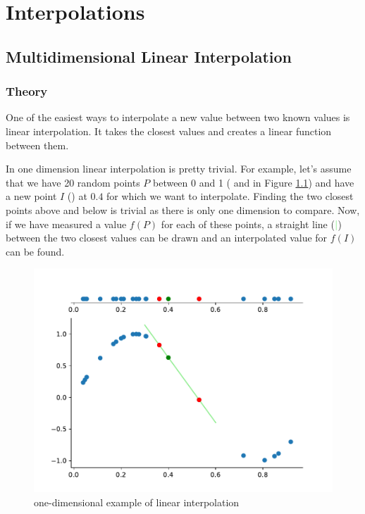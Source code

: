 \chapter{Interpolations}

\section{Multidimensional Linear Interpolation}

\subsection{Theory}

One of the easiest ways to interpolate a new value between two known values is linear interpolation. It takes the closest values and creates a linear function between them.

In one dimension linear interpolation is pretty trivial. For example, let's assume that we have 20 random points $P$ between 0 and 1 (\textcolor{Red}{\textbullet} and  \textcolor{Blue}{\textbullet} in Figure \ref{fig:one-dim-interpolation}) and have a new point $I$ (\textcolor{Green}{\textbullet}) at $0.4$ for which we want to interpolate. Finding the two closest points \textcolor{Red}{\textbullet} above and below is trivial as there is only one dimension to compare. Now, if we have measured a value $f(P)$ for each of these points, a straight line (\textcolor{LightGreen}{\textbf{|}}) between the two closest values can be drawn and an interpolated value for $f(I)$ can be found. 

\begin{figure}[h] %
	\centering
	\includegraphics[width=0.8\linewidth]{images/vis1d.pdf}
	\caption{one-dimensional example of linear interpolation}
	\label{fig:one-dim-interpolation}
\end{figure}

